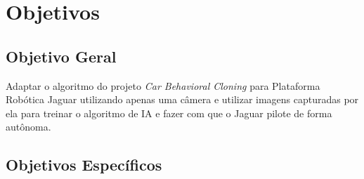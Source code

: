 	\begin{figure}[H]
		\centering
\end{figure}

\section{Objetivos}
\label{sec:objetivos}

\subsection{Objetivo Geral}
\label{sec:objetivo-geral}

Adaptar o algoritmo do projeto \textit{Car Behavioral Cloning} para Plataforma Robótica Jaguar utilizando apenas uma câmera e utilizar imagens capturadas por ela para treinar o algoritmo de \acrlong{IA} e fazer com que o Jaguar pilote de forma autônoma.


\subsection{Objetivos Específicos}
\label{sec:objetivos-especificos}

